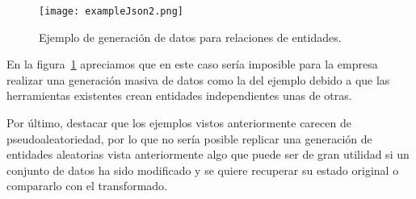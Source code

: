 \begin{figure}[h!]
	\centerline{\texttt{[image: exampleJson2.png]}}
	\caption{Ejemplo de generación de datos para relaciones de entidades.}
	\label{figure:jsonExample2}
\end{figure}

En la figura~\ref{figure:jsonExample2} apreciamos que en este caso sería imposible para la empresa realizar una generación masiva de datos como la del ejemplo debido a que las herramientas existentes crean entidades independientes unas de otras.

Por último, destacar que los ejemplos vistos anteriormente carecen de pseudoaleatoriedad, por lo que no sería posible replicar una generación de entidades aleatorias vista anteriormente algo que puede ser de gran utilidad si un conjunto de datos ha sido modificado y se quiere recuperar su estado original o compararlo con el transformado.


